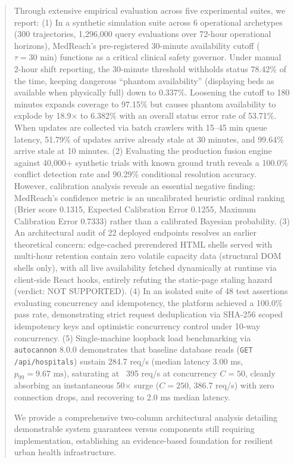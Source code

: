 \documentclass[conference]{IEEEtran}
\begin{document}
\begin{abstract}
Through extensive empirical evaluation across five experimental suites, we report:
(1) In a synthetic simulation suite across 6 operational archetypes (300 trajectories, 1,296,000 query evaluations over 72-hour operational horizons), MedReach's pre-registered 30-minute availability cutoff ($\tau = 30\text{ min}$) functions as a critical clinical safety governor. Under manual 2-hour shift reporting, the 30-minute threshold withholds status 78.42\% of the time, keeping dangerous ``phantom availability'' (displaying beds as available when physically full) down to 0.337\%. Loosening the cutoff to 180 minutes expands coverage to 97.15\% but causes phantom availability to explode by 18.9$\times$ to 6.382\% with an overall status error rate of 53.71\%. When updates are collected via batch crawlers with 15--45 min queue latency, 51.79\% of updates arrive already stale at 30 minutes, and 99.64\% arrive stale at 10 minutes.
(2) Evaluating the production fusion engine against 40,000+ synthetic trials with known ground truth reveals a 100.0\% conflict detection rate and 90.29\% conditional resolution accuracy. However, calibration analysis reveals an essential negative finding: MedReach's confidence metric is an uncalibrated heuristic ordinal ranking (Brier score 0.1315, Expected Calibration Error 0.1255, Maximum Calibration Error 0.7333) rather than a calibrated Bayesian probability.
(3) An architectural audit of 22 deployed endpoints resolves an earlier theoretical concern: edge-cached prerendered HTML shells served with multi-hour retention contain zero volatile capacity data (structural DOM shells only), with all live availability fetched dynamically at runtime via client-side React hooks, entirely refuting the static-page staling hazard (verdict: NOT SUPPORTED).
(4) In an isolated suite of 48 test assertions evaluating concurrency and idempotency, the platform achieved a 100.0\% pass rate, demonstrating strict request deduplication via SHA-256 scoped idempotency keys and optimistic concurrency control under 10-way concurrency.
(5) Single-machine loopback load benchmarking via \texttt{autocannon} 8.0.0 demonstrates that baseline database reads (\texttt{GET /api/hospitals}) sustain 284.7 req/s (median latency 3.00 ms, $p_{99} = 9.67\text{ ms}$), saturating at ~395 req/s at concurrency $C=50$, cleanly absorbing an instantaneous 50$\times$ surge ($C=250$, 386.7 req/s) with zero connection drops, and recovering to 2.0 ms median latency.

We provide a comprehensive two-column architectural analysis detailing demonstrable system guarantees versus components still requiring implementation, establishing an evidence-based foundation for resilient urban health infrastructure.
\end{abstract}
\end{document}
